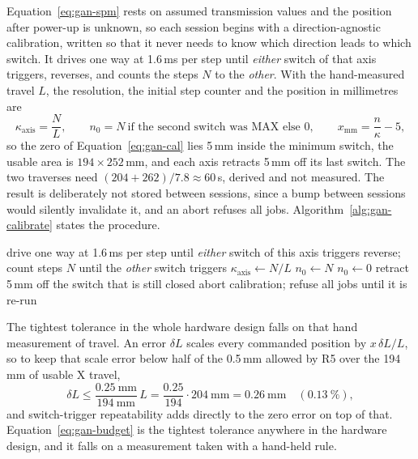 \label{sec:gan-calib}
Equation~\ref{eq:gan-spm} rests on assumed transmission values and the position after power-up is unknown, so each session begins with a direction-agnostic calibration, written so that it never needs to know which direction leads to which switch. It drives one way at 1.6\,ms per step until \emph{either} switch of that axis triggers, reverses, and counts the steps $N$ to the \emph{other}. With the hand-measured travel $L$, the resolution, the initial step counter and the position in millimetres are
\begin{equation}
\kappa_{\mathrm{axis}}=\frac{N}{L},\qquad n_0=N\ \text{if the second switch was MAX else }0,\qquad x_{\mathrm{mm}}=\frac{n}{\kappa}-5,
\label{eq:gan-cal}
\end{equation}
so the zero of Equation~\ref{eq:gan-cal} lies 5\,mm inside the minimum switch, the usable area is $194\times252$\,mm, and each axis retracts 5\,mm off its last switch. The two traverses need $(204+262)/7.8\approx60$\,s, derived and not measured. The result is deliberately not stored between sessions, since a bump between sessions would silently invalidate it, and an abort refuses all jobs. Algorithm~\ref{alg:gan-calibrate} states the procedure.

\begin{algorithm}[!htbp]
\caption{Direction-agnostic calibration of one axis}
\label{alg:gan-calibrate}
\begin{algorithmic}[1]
\STATE drive one way at 1.6\,ms per step until \emph{either} switch of this axis triggers
\STATE reverse; count steps $N$ until the \emph{other} switch triggers
\STATE $\kappa_{\mathrm{axis}}\leftarrow N/L$ 
    \STATE $n_0\leftarrow N$
\ELSE
    \STATE $n_0\leftarrow0$
\ENDIF
\STATE retract 5\,mm off the switch that is still closed
    \STATE abort calibration; refuse all jobs until it is re-run
\ENDIF
\end{algorithmic}
\end{algorithm}

The tightest tolerance in the whole hardware design falls on that hand measurement of travel. An error $\delta L$ scales every commanded position by $x\,\delta L/L$, so to keep that scale error below half of the 0.5\,mm allowed by R5 over the 194\,mm of usable X travel,
\begin{equation}
\delta L\le\frac{0.25\ \mathrm{mm}}{194\ \mathrm{mm}}\,L=\frac{0.25}{194}\cdot204\ \mathrm{mm}=0.26\ \mathrm{mm}\quad(0.13\ \%),
\label{eq:gan-budget}
\end{equation}
and switch-trigger repeatability adds directly to the zero error on top of that. Equation~\ref{eq:gan-budget} is the tightest tolerance anywhere in the hardware design, and it falls on a measurement taken with a hand-held rule.

